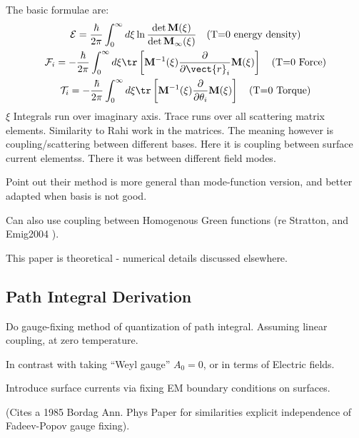 The basic formulae are: 
\begin{gather}
  \mathcal{E} = \frac{\hbar}{2\pi}\int_0^\infty d\xi \ln\frac{\det\mathbf{M}(\xi)}{\det\mathbf{M}_\infty(\xi)}
  \quad \text{(T=0 energy density)}\\
  \mathcal{F}_i = -\frac{\hbar}{2\pi}\int_0^\infty d\xi \tr\left[\mathbf{M}^{-1}(\xi)
\frac{\partial}{\partial \vect{r}_i}\mathbf{M}(\xi)\right]\quad \text{(T=0 Force)}\\
  \mathcal{T}_i = -\frac{\hbar}{2\pi}\int_0^\infty d\xi \tr\left[\mathbf{M}^{-1}(\xi)
\frac{\partial}{\partial \theta_i}\mathbf{M}(\xi)\right]\quad \text{(T=0 Torque)}
\end{gather}
$\xi$ Integrals run over imaginary axis.  Trace runs over all scattering matrix elements.  
Similarity to Rahi work in the matrices.  The meaning however is coupling/scattering between
different bases.  Here it is coupling between surface current elementss.  There it was 
between different field modes.  

Point out their method is more general than mode-function version, 
and better adapted when basis is not good.

Can also use coupling between Homogenous Green functions (re Stratton, and Emig2004 ).

This paper is theoretical - numerical details discussed elsewhere. 


\subsection{Path Integral Derivation}

Do gauge-fixing method of quantization of path integral.
Assuming linear coupling, at zero temperature.  

In contrast with taking ``Weyl gauge'' $A_0=0$, or in terms of Electric fields.    

Introduce surface currents via fixing EM boundary conditions on surfaces.  

(Cites a 1985 Bordag Ann. Phys Paper for similarities explicit independence of Fadeev-Popov
gauge fixing).

